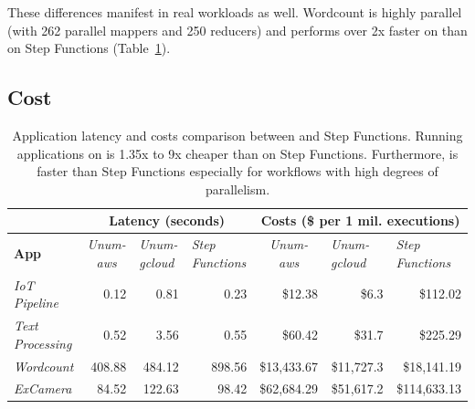 These differences manifest in real workloads as well. Wordcount is highly
parallel (with 262 parallel mappers and 250 reducers) and performs over 2x
faster on \name{} than on Step Functions (Table~\ref{table:macro}).


\subsection{Cost}

\begin{table}[t]
  \centering
  \begin{tabular}{|l|rrr|rrr|}
\hline
                         & \multicolumn{3}{c|}{\textbf{Latency (seconds)}}                    & \multicolumn{3}{c|}{\textbf{Costs (\$ per 1 mil. executions)}} \\ \hline
\textbf{App} &
  \multicolumn{1}{c|}{\textit{Unum-aws}} &
  \multicolumn{1}{l|}{\textit{Unum-gcloud}} &
  \multicolumn{1}{l|}{\textit{Step Functions}} &
  \multicolumn{1}{c|}{\textit{Unum-aws}} &
  \multicolumn{1}{l|}{\textit{Unum-gcloud}} &
  \multicolumn{1}{l|}{\textit{Step Functions}} \\ \hline
\textit{IoT Pipeline}    & \multicolumn{1}{r|}{0.12}   & \multicolumn{1}{r|}{0.81}   & 0.23   & \multicolumn{1}{r|}{\$12.38}             & \multicolumn{1}{r|}{\$6.3}         & \$112.02            \\ \hline
\textit{Text Processing} & \multicolumn{1}{r|}{0.52}   & \multicolumn{1}{r|}{3.56}   & 0.55   & \multicolumn{1}{r|}{\$60.42}             & \multicolumn{1}{r|}{\$31.7}        & \$225.29            \\ \hline
\textit{Wordcount}       & \multicolumn{1}{r|}{408.88} & \multicolumn{1}{r|}{484.12} & 898.56 & \multicolumn{1}{r|}{\$13,433.67}         & \multicolumn{1}{r|}{\$11,727.3}    & \$18,141.19         \\ \hline
\textit{ExCamera}        & \multicolumn{1}{r|}{84.52}  & \multicolumn{1}{r|}{122.63} & 98.42  & \multicolumn{1}{r|}{\$62,684.29}         & \multicolumn{1}{r|}{\$51,617.2}    & \$114,633.13        \\ \hline
\end{tabular}
  \caption{Application latency and costs comparison between \name{} and Step
    Functions. Running applications on \name{} is 1.35x to 9x cheaper than
    on Step Functions. Furthermore, \name{} is faster than Step Functions
    especially for workflows with high degrees of parallelism.}
  \label{table:macro}
\end{table}

